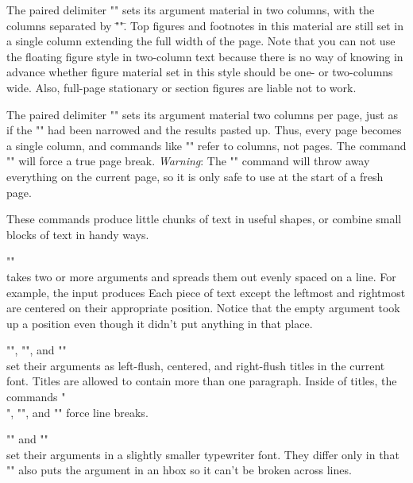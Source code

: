 
The paired delimiter \+"\begintwocolumntext"\+ sets its argument
material in two columns, with the columns separated by
\="\columnskip"\=.  Top figures and footnotes in this material
are still set in a single column extending the full width of the
page.  Note that you can not use the floating figure style in
two-column text because there is no way of knowing in advance
whether figure material set in this style should be one- or
two-columns wide.  Also, full-page stationary or section figures
are liable not to work.

The paired delimiter \+"\begindoublecolumn"\+ sets its argument
material two columns per page, just as if the "\hsize" had been
narrowed and the results pasted up.  Thus, every page becomes a
single column, and commands like "\eject" refer to columns, not
pages.  The command \+"\pageeject"\+ will force a true page
break.  {\it Warning}: The "\begindoublecolumn" command will
throw away everything on the current page, so it is only safe to
use at the start of a fresh page.


These commands produce little chunks of text in useful shapes, or
combine small blocks of text in handy ways.

\begingab

\*\+"\spread"\+\\takes two or more arguments and spreads them out
evenly spaced on a line.  For example, the input
\beginverb
{}
\endverb
produces
\begintextlines
{}
\endtextlines
Each piece of text except the leftmost and rightmost are centered
on their appropriate position.  Notice that the empty argument
took up a position even though it didn't put anything in that
place.

\*\+"\begintleft"\+, \+"\begintcenter"\+, and
\+"\begintright"\+\\set their arguments as left-flush, centered,
and right-flush titles in the current font.  Titles are allowed
to contain more than one paragraph.  Inside of titles, the
commands \+"\\"\+, \+"\cr"\+, and \+"\crcr"\+ force line breaks.

\*\+"\sy"\+ and \+"\sybox"\+\\set their arguments in a slightly
smaller typewriter font.  They differ only in that "\sybox" also
puts the argument in an hbox so it can't be broken across lines.

